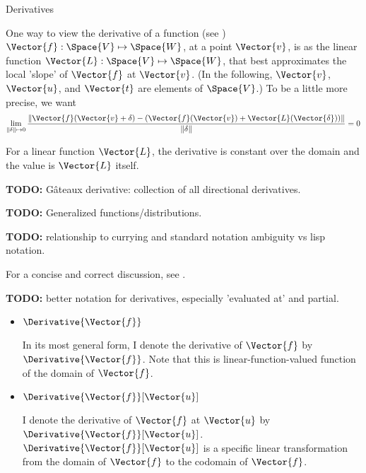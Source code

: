 \begin{plSection}{Derivatives}
\label{sec:Derivatives}

One way to view the derivative of a 
function (see )
$\Vector{f} : \Space{V} \mapsto \Space{W}$,
at a point $\Vector{v}$,
is as the linear function $\Vector{L}:\Space{V} \mapsto \Space{W}$,
that best approximates the local 'slope' of $\Vector{f}$ at $\Vector{v}$.
(In the following, $\Vector{v}$, $\Vector{u}$, and $\Vector{t}$ are elements of $\Space{V}$.)
To be a little more precise, we want
\begin{equation}
\lim_{ \|{\bf \delta}  \| \mapsto 0}
\frac{ \| \Vector{f}(\Vector{v} + {\bf \delta}) - (\Vector{f}(\Vector{v}) + \Vector{L}(\Vector{\delta})) \|}
{\|{\bf \delta}  \| }
 = 0
\end{equation}

\begin{plNote}{}{}
For a linear function $\Vector{L}$,
the derivative is constant over the domain
and the value is $\Vector{L}$ itself.
\end{plNote}

\textbf{TODO:} G\^{a}teaux derivative: collection of all
directional derivatives.

\textbf{TODO:} Generalized functions/distributions.

\textbf{TODO:}
relationship to currying and standard notation ambiguity vs
lisp notation.

For a concise and correct discussion, 
see .

\textbf{TODO:} better notation for derivatives, especially 
'evaluated at' and partial.

\begin{itemize}

\item $\Derivative{\Vector{f}}$

In its most general form,
I denote the derivative of $\Vector{f}$ by $\Derivative{\Vector{f}}$.
Note that this is linear-function-valued function 
of the domain of $\Vector{f}$.

\item $\Derivative{\Vector{f}}[\Vector{u}]$

I denote the derivative of $\Vector{f}$ at $\Vector{u}$ by 
$\Derivative{\Vector{f}}[\Vector{u}]$.
$\Derivative{\Vector{f}}[\Vector{u}]$ 
is a specific linear transformation from
the domain of $\Vector{f}$ to the codomain of $\Vector{f}$.


\end{itemize}
\end{plSection}
